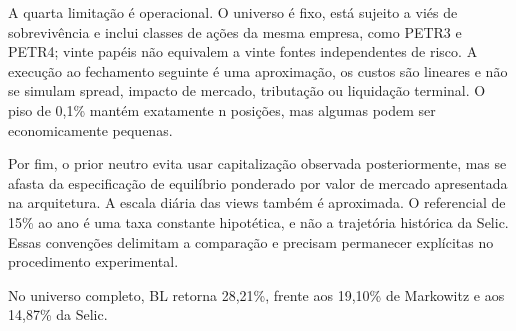 A quarta limitação é operacional. O universo é fixo, está sujeito a viés de sobrevivência e inclui classes de ações da mesma empresa, como PETR3 e PETR4; vinte papéis não equivalem a vinte fontes independentes de risco. A execução ao fechamento seguinte é uma aproximação, os custos são lineares e não se simulam spread, impacto de mercado, tributação ou liquidação terminal. O piso de 0,1\% mantém exatamente n posições, mas algumas podem ser economicamente pequenas.

Por fim, o prior neutro evita usar capitalização observada posteriormente, mas se afasta da especificação de equilíbrio ponderado por valor de mercado apresentada na arquitetura. A escala diária das views também é aproximada. O referencial de 15\% ao ano é uma taxa constante hipotética, e não a trajetória histórica da Selic. Essas convenções delimitam a comparação e precisam permanecer explícitas no procedimento experimental.

No universo completo, BL retorna 28,21\%, frente aos 19,10\% de Markowitz e aos 14,87\% da Selic.

